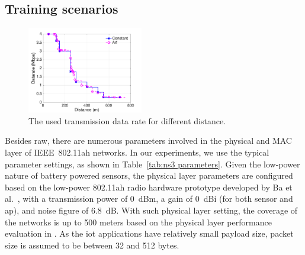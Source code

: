 \subsection{Training scenarios \label{subsec:training scenarios}}


\begin{figure}[t]
  \centering
  \includegraphics[width=0.45\textwidth]{figures/distance-datarate-512bytes}  \caption{The used transmission data rate for different distance. \label{fig:dist-datarate}}
\end{figure}

Besides \gls{raw}, there are numerous parameters involved in the physical and MAC layer of IEEE~802.11ah networks.
In our experiments, we use the typical parameter settings, 
as shown in Table~\ref{tab:ns3 parameters}. Given the low-power nature of battery powered sensors, the physical layer parameters are configured based on the low-power 802.11ah radio hardware prototype developed by Ba et al.~\cite{Ba2016}, with a transmission power of 0~dBm, a gain of 0~dBi (for both sensor and \gls{ap}), and noise figure of 6.8~dB. With such physical layer setting, the coverage of the networks is up to 500 meters based on the physical layer performance evaluation in \cite{bellekens2017outdoor}. As the \gls{iot} applications have relatively small payload size, packet size is assumed to be between  32 and 512 bytes.


